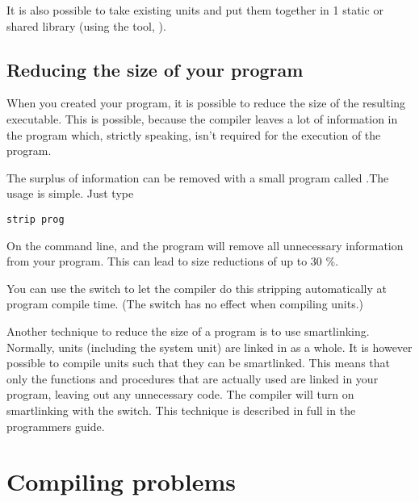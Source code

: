 It is also possible to take existing units and put them
together in 1 static or shared library (using the  tool,
).

\section{Reducing the size of your program}

When you created your program, it is possible to reduce the size of the
resulting executable. This is possible, because the compiler leaves a
lot of information in the program which, strictly speaking, isn't required
for the execution of the program.

The surplus of information can be removed with a small program
called .The usage is simple. Just type
\begin{verbatim}
strip prog
\end{verbatim}
On the command line, and the  program will remove all unnecessary
information from your program. This can lead to size reductions of up to
30 \%.

You can use the  switch to let the compiler do this stripping
automatically at program compile time. (The switch has no effect when
compiling units.)

Another technique to reduce the size of a program is to use smartlinking.
Normally, units (including the system unit) are linked in as a whole.
It is however possible to compile units such that they can be smartlinked.
This means that only the functions and procedures that are actually used
are linked in your program, leaving out any unnecessary code. The compiler
will turn on smartlinking with the  switch. This technique is
described in full in the programmers guide.

\chapter{Compiling problems}

